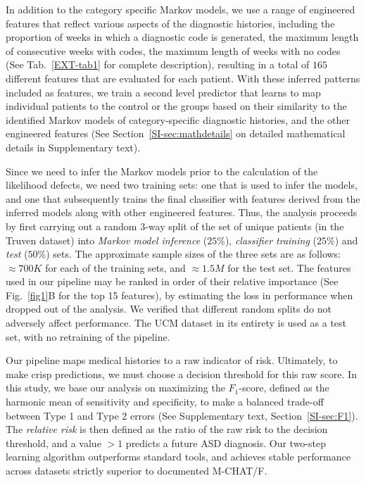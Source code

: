 \documentclass[onecolumn,10pt]{IEEEtran}
\begin{document}
In addition to the category specific Markov models, we use a range of engineered features that reflect various aspects of the diagnostic histories, including the proportion of weeks in which a diagnostic code is generated, the maximum length of consecutive weeks with codes, the maximum length of weeks with no codes (See Tab.~\ref{EXT-tab1} for complete description), resulting in a total of $165$ different features that are evaluated for each patient. With these inferred patterns included as features,  we train a second level predictor that learns to map   individual patients  to the control or the \treatment groups based on their  similarity  to the identified  Markov models of category-specific diagnostic histories, and the other engineered features (See Section~\ref{SI-sec:mathdetails} on detailed mathematical details  in Supplementary  text).


Since we need to infer the Markov models prior to the calculation of the likelihood defects, we need two training sets: one that is used to infer the models, and one that subsequently trains the final classifier  with features  derived  from the inferred models along with other engineered features. Thus, the analysis proceeds by first carrying out a random 3-way split of the set of unique patients (in the Truven dataset) into \textit{Markov model inference} ($25\%$), \textit{classifier training} ($25\%$) and \textit{test} ($50\%$) sets. The approximate sample sizes of the three sets are as follows: $\approx 700K$ for each of  the training sets, and $\approx 1.5M$ for the test set. The features used in our pipeline may be ranked in order of their relative importance (See Fig.~\ref{fig1}B for the top 15 features), by
estimating the loss in performance when dropped out of the analysis. We verified that different random splits do not adversely affect performance. The UCM dataset in its entirety is used as a test set, with no retraining of the pipeline.

Our pipeline maps medical histories to a   raw indicator of 
risk. Ultimately, to make crisp predictions, we must choose  a decision threshold for this raw score. In this study, we base our analysis on maximizing the $F_1$-score, defined as the harmonic mean of sensitivity and specificity, to make a   balanced trade-off between Type 1 and Type 2 errors (See Supplementary text, Section~\ref{SI-sec:F1}). The \textit{relative risk} is then defined as the ratio of the raw  risk to the  decision threshold, and a value  $>1$  predicts a future ASD diagnosis. Our two-step learning algorithm outperforms standard tools, and achieves  stable performance across datasets strictly superior to documented M-CHAT/F.
\end{document}
